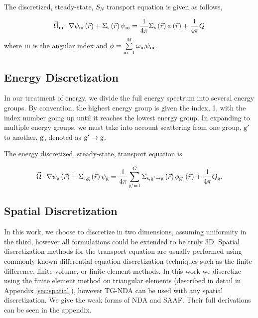 The discretized, steady-state, $S_N$ transport equation is given as follows,

 \begin{equation}
  \vec{\Omega}_{\mathrm{m}} \cdot \nabla \psi_{\mathrm{m}} \left(\vec{r}\right)+ \Sigma_{\mathrm{t}}\left(\vec{r}\right)\psi_{\mathrm{m}} = \frac{1}{4 \pi} \Sigma_{\mathrm{s}}\left(\vec{r}\right) \phi\left(\vec{r}\right) + \frac{1}{4 \pi} Q
  \label{eq:transport-angular}
 \end{equation}
where $\mathrm{m}$ is the angular index and $\phi = \sum\limits_{\mathrm{m}=1}^M \omega_{\mathrm{m}} \psi_{\mathrm{m}}$.

\subsection{Energy Discretization}
In our treatment of energy, we divide the full energy spectrum into several energy groups. By convention, the highest energy group is given the index, 1, with the index number going up until it reaches the lowest energy group. In expanding to multiple energy groups, we must take into account scattering from one group, $\mathrm{g}'$ to another, $\mathrm{g}$, denoted as $\mathrm{g}' \rightarrow \mathrm{g} $. 

The energy discretized, steady-state, transport equation is

 \begin{equation}
  \vec{\Omega} \cdot \nabla \psi_{\mathrm{g}} \left(\vec{r}\right)+ \Sigma_{\mathrm{t}, \mathrm{g}}\left(\vec{r}\right)\psi_{\mathrm{g}} = \frac{1}{4 \pi} \sum\limits_{\mathrm{g}'=1}^{G}\Sigma_{\mathrm{s}, \mathrm{g}' \rightarrow \mathrm{g}}\left(\vec{r}\right) \phi_{\mathrm{g}'}\left(\vec{r}\right) + \frac{1}{4 \pi} Q_{\mathrm{g}}.
  \label{eq:transport-energy}
 \end{equation}


\subsection{Spatial Discretization}
In this work, we choose to discretize in two dimensions, assuming uniformity in the third, however all formulations could be extended to be truly 3D. Spatial discretization methods for the transport equation are usually performed using commonly known differential equation discretization techniques such as the finite difference, finite volume, or finite element methods. In this work we discretize using the finite element method on triangular elements (described in detail in Appendix \ref{sec:spatial}), however TG-NDA can be used with any spatial discretization. We give the weak forms of NDA and SAAF. Their full derivations can be seen in the appendix. 



